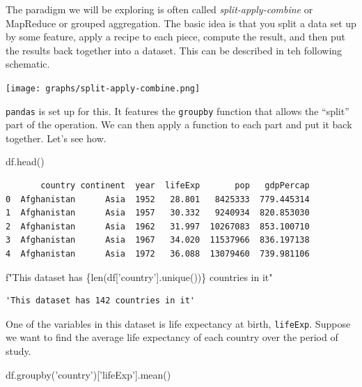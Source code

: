 \documentclass[
  letterpaper,
]{scrbook}
\newenvironment{Shaded}{\begin{snugshade}}{\end{snugshade}}
\newcommand{\BuiltInTok}[1]{#1}
\newcommand{\NormalTok}[1]{#1}
\newcommand{\SpecialCharTok}[1]{\textcolor[rgb]{0.00,0.00,0.00}{#1}}
\newcommand{\SpecialStringTok}[1]{\textcolor[rgb]{0.31,0.60,0.02}{#1}}
\newcommand{\StringTok}[1]{\textcolor[rgb]{0.31,0.60,0.02}{#1}}
\begin{document}
The paradigm we will be exploring is often called \emph{split-apply-combine} or MapReduce or grouped aggregation. The basic idea is that you split a data set up by some feature, apply a recipe to each piece, compute the result, and then put the results back together into a dataset. This can be described in teh following schematic.

\texttt{[image: graphs/split-apply-combine.png]}

\texttt{pandas} is set up for this. It features the \texttt{groupby} function that allows the ``split'' part of the operation. We can then apply a function to each part and put it back together. Let's see how.

\begin{Shaded}
\begin{Highlighting}[]
\NormalTok{df.head()}
\end{Highlighting}
\end{Shaded}

\begin{verbatim}
       country continent  year  lifeExp       pop   gdpPercap
0  Afghanistan      Asia  1952   28.801   8425333  779.445314
1  Afghanistan      Asia  1957   30.332   9240934  820.853030
2  Afghanistan      Asia  1962   31.997  10267083  853.100710
3  Afghanistan      Asia  1967   34.020  11537966  836.197138
4  Afghanistan      Asia  1972   36.088  13079460  739.981106
\end{verbatim}

\begin{Shaded}
\begin{Highlighting}[]
\SpecialStringTok{f"This dataset has }\SpecialCharTok{\{}\BuiltInTok{len}\NormalTok{(df[}\StringTok{'country'}\NormalTok{].unique())}\SpecialCharTok{\}}\SpecialStringTok{ countries in it"}
\end{Highlighting}
\end{Shaded}

\begin{verbatim}
'This dataset has 142 countries in it'
\end{verbatim}

One of the variables in this dataset is life expectancy at birth, \texttt{lifeExp}. Suppose we want to find the average life expectancy of each country over the period of study.

\begin{Shaded}
\begin{Highlighting}[]
\NormalTok{df.groupby(}\StringTok{'country'}\NormalTok{)[}\StringTok{'lifeExp'}\NormalTok{].mean()}
\end{Highlighting}
\end{Shaded}
\end{document}
